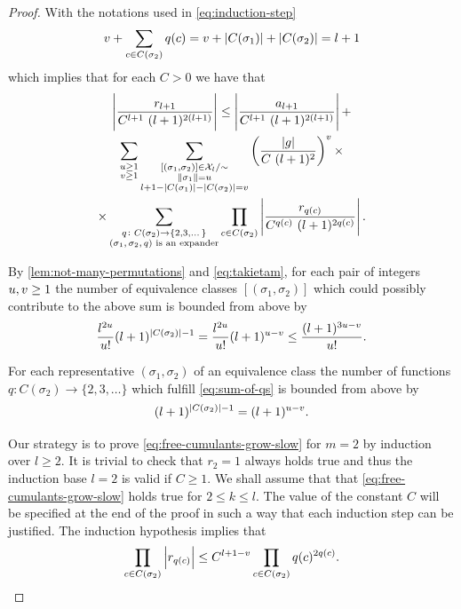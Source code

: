 \documentclass[12pt,usenames,dvipsnames,svgnames,table]{amsart}
\begin{document}
\begin{proof}
	With the notations used in \cref{eq:induction-step}
	\begin{equation}
	\label{eq:sum-of-qs}
	v+ \sum_{c\in C(\sigma_2)} q(c) = v+ |C(\sigma_1)|+|C(\sigma_2)|=l+1    
	\end{equation}
	which implies that for each $C>0$ we have that
	\begin{multline}
	\label{eq:induction-step-2}
	\left| \frac{ r_{l+1}}{C^{l+1}\ (l+1)^{2(l+1)}} \right|  \leq 
	\left| \frac{a_{l+1}}{C^{l+1}\ (l+1)^{2(l+1)}} \right| + \\
	\sum_{\substack{u\geq 1 \\ v\geq 1}} 
	\sum_{\substack{[(\sigma_1,\sigma_2)]\in\mathcal{X}_l/\sim \\ \|\sigma_1\|=u \\ l+1-|C(\sigma_1)|-|C(\sigma_2)|=v}} 
	\left(\frac{|g|}{C\ (l+1)^2}\right)^{v} \times \\ \times
	\sum_{\substack{q\colon C(\sigma_2) \to\{2,3,\dots\} \\
			\text{$(\sigma_1,\sigma_2,q)$ is an expander}}}
	\prod_{c\in C(\sigma_2)} \left| \frac{r_{q(c)}}{C^{q(c)}\ (l+1)^{2 q(c)}} \right|.
	\end{multline}
	
	By \cref{lem:not-many-permutations} and \eqref{eq:takietam}, 
	for each pair of integers $u,v\geq 1$ the number of equivalence classes $[(\sigma_1,\sigma_2)]$ which
	could possibly contribute to the above sum is bounded from above by
	\[ \frac{l^{2u}}{u!}  (l+1)^{|C(\sigma_2)|-1} = \frac{l^{2u}}{u!}  (l+1)^{u-v} \leq \frac{(l+1)^{3u-v}}{u!}.\]
	
	For each representative $(\sigma_1,\sigma_2)$ of an equivalence class
	the number of functions $q\colon C(\sigma_2)\to\{2,3,\dots\}$ which fulfill
	\eqref{eq:sum-of-qs} is bounded from above by 
	\[ (l+1)^{|C(\sigma_2)|-1}= (l+1)^{u-v}.\] 
	
	\medskip
	
	
	Our strategy is to prove \eqref{eq:free-cumulants-grow-slow} for $m=2$ by induction over $l\geq 2$.
	It is trivial to check that $r_2 = 1$ always holds true and thus the induction base $l=2$
	is valid if $C\geq 1$.
	We shall assume that that \eqref{eq:free-cumulants-grow-slow} holds true for $2\leq k\leq l$.
	The value of the constant $C$ will be specified at the end of the proof in such a way that
	each induction step can be justified.
	The induction hypothesis implies that
	\begin{equation*}
	\prod_{c\in C(\sigma_2)} \left| r_{q(c)} \right| \leq C^{l+1-v}  \prod_{c\in C(\sigma_2)} q(c)^{2q(c)}.
	\end{equation*}
	

\end{proof}
\end{document}
